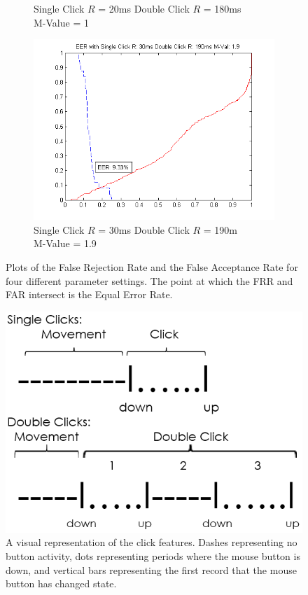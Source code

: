 \documentclass[conference]{IEEEtran}
\begin{document}
\begin{figure}
\begin{subfigure}{.5\textwidth}
  \caption{Single Click $R$ = 20ms Double Click $R$ = 180ms\\M-Value = 1}
  \label{fig:sfig3}
\end{subfigure}%
\begin{subfigure}{.5\textwidth}
  \centering
  \includegraphics[width=.8\linewidth]{19M}
  \caption{Single Click $R$ = 30ms Double Click $R$ = 190m\\ M-Value = 1.9}
  \label{fig:sfig4}
\end{subfigure}
\caption{Plots of the False Rejection Rate and the False Acceptance Rate for four different parameter settings. The point at which the FRR and FAR intersect is the Equal Error Rate. }
\label{fig:fig}
\end{figure}

\begin{figure}
  \includegraphics[width=1\linewidth]{clickDiag}
  \caption{A visual representation of the click features. Dashes representing no button activity, dots representing periods where the mouse button is down, and vertical bars representing the first record that the mouse button has changed state.  \label{fig:visualdefinition}}
\end{figure}
\end{document}
